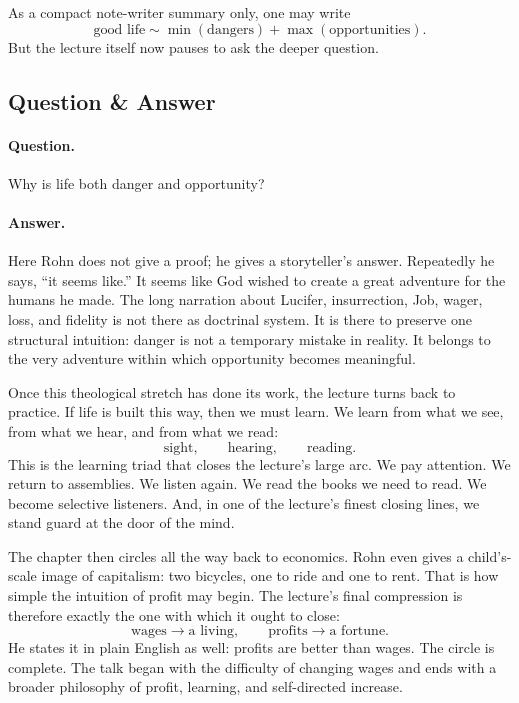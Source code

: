 As a compact note-writer summary only, one may write
\begin{equation}
\text{good life} \sim \min(\text{dangers})+\max(\text{opportunities}).
\end{equation}
But the lecture itself now pauses to ask the deeper question.

\subsection{Question \& Answer}

\paragraph{Question.} Why is life both danger and opportunity?

\paragraph{Answer.} Here Rohn does not give a proof; he gives a storyteller's answer. Repeatedly he says, ``it seems like.'' It seems like God wished to create a great adventure for the humans he made. The long narration about Lucifer, insurrection, Job, wager, loss, and fidelity is not there as doctrinal system. It is there to preserve one structural intuition: danger is not a temporary mistake in reality. It belongs to the very adventure within which opportunity becomes meaningful.

Once this theological stretch has done its work, the lecture turns back to practice. If life is built this way, then we must learn. We learn from what we see, from what we hear, and from what we read:
\begin{equation}
\text{sight}, \qquad \text{hearing}, \qquad \text{reading}.
\end{equation}
This is the learning triad that closes the lecture's large arc. We pay attention. We return to assemblies. We listen again. We read the books we need to read. We become selective listeners. And, in one of the lecture's finest closing lines, we stand guard at the door of the mind.

The chapter then circles all the way back to economics. Rohn even gives a child's-scale image of capitalism: two bicycles, one to ride and one to rent. That is how simple the intuition of profit may begin. The lecture's final compression is therefore exactly the one with which it ought to close:
\begin{equation}
\text{wages} \to \text{a living}, \qquad
\text{profits} \to \text{a fortune}.
\end{equation}
He states it in plain English as well: profits are better than wages. The circle is complete. The talk began with the difficulty of changing wages and ends with a broader philosophy of profit, learning, and self-directed increase.

